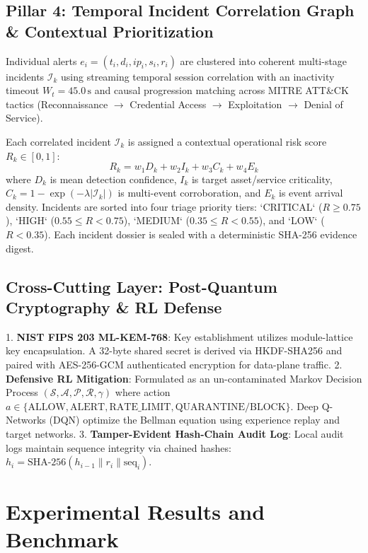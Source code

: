 \documentclass{ieeeaccess}
\begin{document}
\subsection{Pillar 4: Temporal Incident Correlation Graph & Contextual Prioritization}
Individual alerts $e_i = (t_i, d_i, ip_i, s_i, r_i)$ are clustered into coherent multi-stage incidents $\mathcal{I}_k$ using streaming temporal session correlation with an inactivity timeout $W_t = 45.0\,\text{s}$ and causal progression matching across MITRE ATT\&CK tactics (Reconnaissance $\to$ Credential Access $\to$ Exploitation $\to$ Denial of Service).

Each correlated incident $\mathcal{I}_k$ is assigned a contextual operational risk score $R_k \in [0, 1]$:
\begin{equation}
    R_k = w_1 D_k + w_2 I_k + w_3 C_k + w_4 E_k
\end{equation}
where $D_k$ is mean detection confidence, $I_k$ is target asset/service criticality, $C_k = 1 - \exp(-\lambda |\mathcal{I}_k|)$ is multi-event corroboration, and $E_k$ is event arrival density. Incidents are sorted into four triage priority tiers: `CRITICAL` ($R \ge 0.75$), `HIGH` ($0.55 \le R < 0.75$), `MEDIUM` ($0.35 \le R < 0.55$), and `LOW` ($R < 0.35$). Each incident dossier is sealed with a deterministic SHA-256 evidence digest.

\subsection{Cross-Cutting Layer: Post-Quantum Cryptography & RL Defense}
1. \textbf{NIST FIPS 203 ML-KEM-768}: Key establishment utilizes module-lattice key encapsulation. A 32-byte shared secret is derived via HKDF-SHA256 and paired with AES-256-GCM authenticated encryption for data-plane traffic.
2. \textbf{Defensive RL Mitigation}: Formulated as an un-contaminated Markov Decision Process $(\mathcal{S}, \mathcal{A}, \mathcal{P}, \mathcal{R}, \gamma)$ where action $a \in \{\text{ALLOW}, \text{ALERT}, \text{RATE\_LIMIT}, \text{QUARANTINE/BLOCK}\}$. Deep Q-Networks (DQN) optimize the Bellman equation using experience replay and target networks.
3. \textbf{Tamper-Evident Hash-Chain Audit Log}: Local audit logs maintain sequence integrity via chained hashes: $h_i = \text{SHA-256}(h_{i-1} \parallel r_i \parallel \text{seq}_i)$.

\section{Experimental Results and Benchmark}
\label{sec:results}
\end{document}
